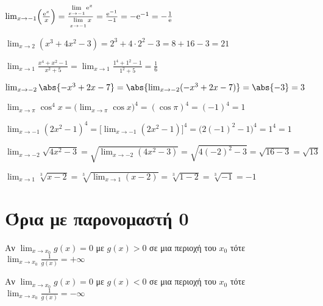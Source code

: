 \begin{example}
  $ \lim_{x \to -1} \Bigl(\frac{\mathrm{e}^{x}}{x}\Bigr) = \frac{\lim\limits_{x \to -1}
  \mathrm{e}^{x}}{\lim\limits_{x \to -1}x} = \frac{\mathrm{e}^{-1}}{-1} = -
  \mathrm{e}^{-1} = - \frac{1}{\mathrm{e}} $  
\end{example}

\begin{example}
  $ \lim_{x \to 2} (x^{3}+4x^{2}-3) = 2^{3}+ 4 \cdot 2^{2} -3 = 8+16-3 = 21 $  
\end{example}

\begin{example}
  $ \lim_{x \to 1} \frac{x^{4}+x^{2}-1}{x^{2}+5} = \lim_{x \to 1}
  \frac{1^{4}+1^{2}-1}{1^{2}+5} = \frac{1}{6} $
\end{example}

\begin{example}
  $ \lim_{x \to -2} \abs{-x^{3}+2x-7} = \abs{\lim_{x \to -2} (-x^{3}+2x-7)} = \abs{-3}
  = 3$ 
\end{example}

\begin{example}
  $ \lim_{x \to \pi} \cos^{4}{x} = \bigl(\lim_{x \to \pi} \cos{x} \bigr)^{4} =
  (\cos{\pi} )^{4} = (-1)^{4}=1 $
\end{example}

\begin{example} 
  $\lim_{x \to -1} (2x^{2}-1)^{4} = \bigl[\lim_{x \to -1}
  (2x^{2}-1)\bigr]^{4} = \bigl(2(-1)^{2}-1\bigr)^{4} = 1^{4} = 1 $ 
\end{example}

\begin{example}
  $ \lim_{x \to -2} \sqrt{4x^{2}-3} = \sqrt{\lim_{x \to -2} (4x^{2}-3)} =
  \sqrt{4(-2)^{2}-3} = \sqrt{16-3} = \sqrt{13} $    
\end{example}

\begin{example}
  $ \lim_{x \to 1} \sqrt[3]{x-2} = \sqrt[3]{\lim_{x \to 1} (x-2)} = \sqrt[3]{1-2} =
  \sqrt[3]{-1} = -1 $
\end{example}


\section*{Όρια με παρονομαστή 0}

\begin{prop}
\item {}
  \begin{myitemize}
    \item Αν $ \lim_{x \to x_{0}} g(x) = 0 $ με $ g(x)>0 $ σε μια περιοχή του $ x_{0} $ 
      τότε $ \lim_{x \to x_{0}} \frac{1}{g(x)} = + \infty $
    \item Αν $ \lim_{x \to x_{0}} g(x) = 0 $ με $ g(x)<0 $ σε μια περιοχή του $ x_{0} $ 
      τότε $ \lim_{x \to x_{0}} \frac{1}{g(x)} = - \infty $
  \end{myitemize}
\end{prop}


